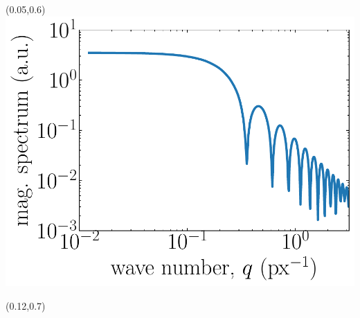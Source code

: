 {	\begin{textblock}{0.25}(0.05,0.6)
	\centering	
	\includegraphics[width=\textwidth]
	{Sources/X-DFA/form_factor.pdf}
	\end{textblock}

	\begin{textblock}{0.06}(0.12,0.7)
	\centering	
	\end{textblock}
}






